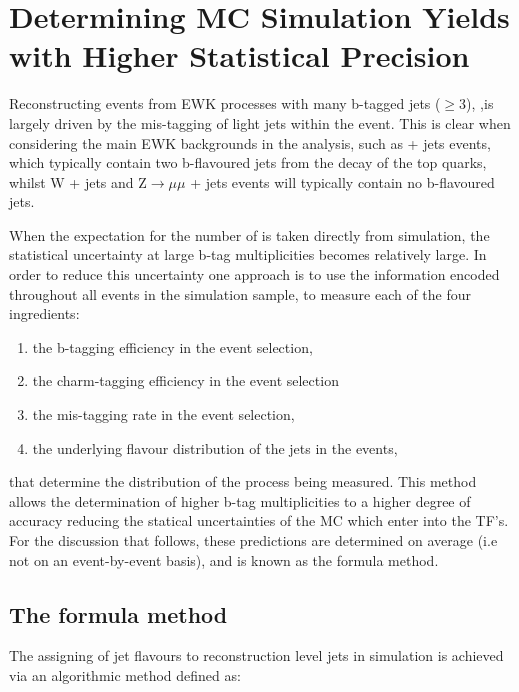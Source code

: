 \section{Determining MC Simulation Yields with Higher Statistical Precision}
\label{subsec:backgroundestimation}

Reconstructing events from \ac{EWK} processes with many b-tagged jets ($\geq$3), \nbreco  ,is largely driven by the mis-tagging of light jets within the event. This is clear when considering the main \ac{EWK} backgrounds in the analysis, such as \ttbar + jets events, which typically contain two b-flavoured jets from the decay of the top quarks, whilst W + jets and Z$\rightarrow \mu\mu$ + jets events will typically contain no b-flavoured jets.

When the expectation for the number of \nbreco is taken directly from simulation, the statistical uncertainty at large b-tag multiplicities becomes relatively large. In order to reduce this uncertainty one approach is to use the information encoded throughout all events in the simulation sample, to measure each of the four ingredients:

\begin{enumerate}
\item the b-tagging efficiency in the event selection,
\item the charm-tagging efficiency in the event selection
\item the mis-tagging rate in the event selection,
\item the underlying flavour distribution of the jets in the events,
\end{enumerate}

 that determine the \nbreco distribution of the process being measured. This method allows the determination of higher b-tag multiplicities to a higher degree of accuracy reducing the statical uncertainties of the MC which enter into the \ac{TF}'s. For the discussion that follows, these predictions are determined on average (i.e not on an event-by-event basis), and is known as the formula method.

\subsection{The formula method}
\label{subsec:formulamethod}

The assigning of jet flavours to reconstruction level jets in simulation is achieved via an algorithmic method defined as:

